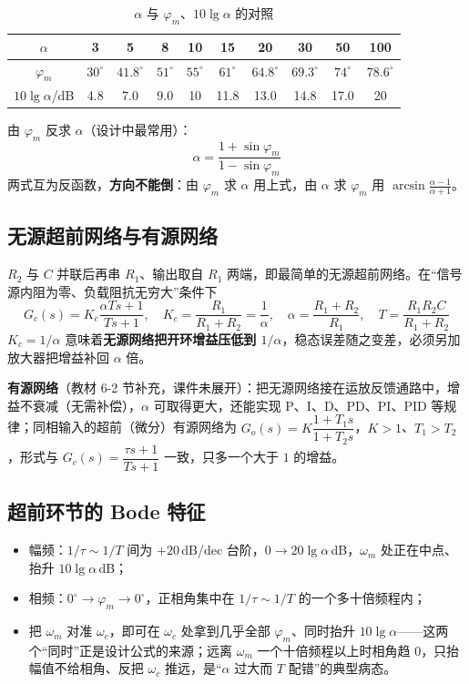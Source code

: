 \begin{table}[htbp]
\centering
\caption{$\alpha$ 与 $\varphi_m$、$10\lg\alpha$ 的对照}
\begin{tabular}{cccccccccc}
\toprule
$\alpha$ & 3 & 5 & 8 & 10 & 15 & 20 & 30 & 50 & 100 \\
\midrule
$\varphi_m$ & $30^\circ$ & $41.8^\circ$ & $51^\circ$ & $55^\circ$ & $61^\circ$ & $64.8^\circ$ & $69.3^\circ$ & $74^\circ$ & $78.6^\circ$ \\
$10\lg\alpha$/dB & 4.8 & 7.0 & 9.0 & 10 & 11.8 & 13.0 & 14.8 & 17.0 & 20 \\
\bottomrule
\end{tabular}
\end{table}

\noindent 由 $\varphi_m$ 反求 $\alpha$（设计中最常用）：
\[
\boxed{\ \alpha=\frac{1+\sin\varphi_m}{1-\sin\varphi_m}\ }
\]
两式互为反函数，\textbf{方向不能倒}：由 $\varphi_m$ 求 $\alpha$ 用上式，由 $\alpha$ 求 $\varphi_m$ 用 $\arcsin\frac{\alpha-1}{\alpha+1}$。

\subsection{无源超前网络与有源网络}
$R_2$ 与 $C$ 并联后再串 $R_1$、输出取自 $R_1$ 两端，即最简单的无源超前网络。在“信号源内阻为零、负载阻抗无穷大”条件下
\[
G_c(s)=K_c\frac{\alpha Ts+1}{Ts+1},\quad
K_c=\frac{R_1}{R_1+R_2}=\frac{1}{\alpha},\quad
\alpha=\frac{R_1+R_2}{R_1},\quad
T=\frac{R_1R_2C}{R_1+R_2}
\]
$K_c=1/\alpha$ 意味着\textbf{无源网络把开环增益压低到 $1/\alpha$}，稳态误差随之变差，必须另加放大器把增益补回 $\alpha$ 倍。

\noindent\textbf{有源网络}（教材 6-2 节补充，课件未展开）：把无源网络接在运放反馈通路中，增益不衰减（无需补偿），$\alpha$ 可取得更大，还能实现 P、I、D、PD、PI、PID 等规律；同相输入的超前（微分）有源网络为 $G_o(s)=K\dfrac{1+T_1s}{1+T_2s}$，$K>1$、$T_1>T_2$，形式与 $G_c(s)=\dfrac{\tau s+1}{Ts+1}$ 一致，只多一个大于 $1$ 的增益。

\subsection{超前环节的 Bode 特征}
\begin{itemize}
    \item 幅频：$1/\tau\sim1/T$ 间为 $+20$\,dB/dec 台阶，$0\to20\lg\alpha$\,dB，$\omega_m$ 处正在中点、抬升 $10\lg\alpha$\,dB；
    \item 相频：$0^\circ\to\varphi_m\to0^\circ$，正相角集中在 $1/\tau\sim1/T$ 的一个多十倍频程内；
    \item 把 $\omega_m$ 对准 $\omega_c$，即可在 $\omega_c$ 处拿到几乎全部 $\varphi_m$、同时抬升 $10\lg\alpha$——这两个“同时”正是设计公式的来源；远离 $\omega_m$ 一个十倍频程以上时相角趋 $0$，只抬幅值不给相角、反把 $\omega_c$ 推远，是“$\alpha$ 过大而 $T$ 配错”的典型病态。
\end{itemize}

